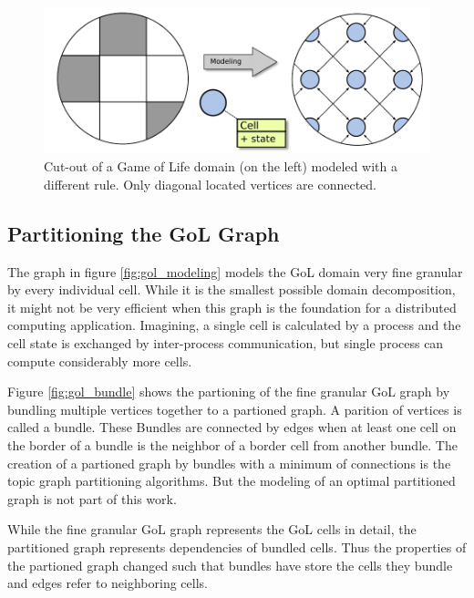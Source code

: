 \begin{figure}[H]
  \centering \includegraphics[width=\textwidth]{graphics/30_gol_modeling_changed}
  \caption{Cut-out of a Game of Life domain (on the left) modeled
    with a different rule. Only diagonal located vertices are connected.}
  \label{fig:gol_modeling_changed}
\end{figure}


\subsection{Partitioning the GoL Graph}
The graph in figure \ref{fig:gol_modeling} models the GoL domain very fine
granular by every individual cell. While it is the smallest possible
domain decomposition, it might not be very efficient when this graph
is the foundation for a distributed computing application. Imagining, a
single cell is calculated by a process and the cell state is exchanged
by inter-process communication, but single process can compute
considerably more cells.

Figure \ref{fig:gol_bundle} shows the partioning of the fine granular
GoL graph by bundling multiple vertices together to a partioned
graph. A parition of vertices is called a bundle. These Bundles are
connected by edges when at least one cell on the border of a bundle
is the neighbor of a border cell from another bundle.  The creation of
a partioned graph by bundles with a minimum of connections is the
topic graph partitioning algorithms. But the modeling of an optimal
partitioned graph is not part of this work.

While the fine granular GoL graph represents the GoL cells in detail, the
partitioned graph represents dependencies of bundled cells. Thus
the properties of the partioned graph changed such that bundles
have store the cells they bundle and edges refer to neighboring
cells.


